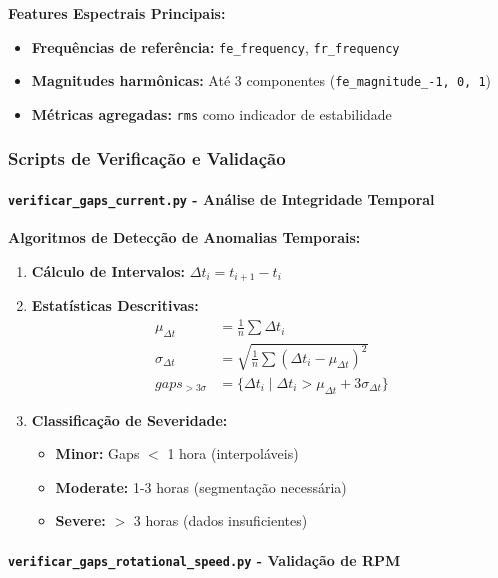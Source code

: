 \textbf{Features Espectrais Principais:}
\begin{itemize}
    \item \textbf{Frequências de referência:} \texttt{fe\_frequency}, \texttt{fr\_frequency}
    \item \textbf{Magnitudes harmônicas:} Até 3 componentes (\texttt{fe\_magnitude\_-1, 0, 1})
    \item \textbf{Métricas agregadas:} \texttt{rms} como indicador de estabilidade
\end{itemize}

\subsubsection{Scripts de Verificação e Validação}

\paragraph{\texttt{verificar\_gaps\_current.py} - Análise de Integridade Temporal}

\textbf{Algoritmos de Detecção de Anomalias Temporais:}

\begin{enumerate}
    \item \textbf{Cálculo de Intervalos:} $\Delta t_i = t_{i+1} - t_i$
    \item \textbf{Estatísticas Descritivas:}
    \begin{align}
    \mu_{\Delta t} &= \frac{1}{n} \sum \Delta t_i \\
    \sigma_{\Delta t} &= \sqrt{\frac{1}{n} \sum (\Delta t_i - \mu_{\Delta t})^2} \\
    gaps_{>3\sigma} &= \{ \Delta t_i \mid \Delta t_i > \mu_{\Delta t} + 3\sigma_{\Delta t} \}
    \end{align}
    \item \textbf{Classificação de Severidade:}
    \begin{itemize}
        \item \textbf{Minor:} Gaps $<$ 1 hora (interpoláveis)
        \item \textbf{Moderate:} 1-3 horas (segmentação necessária)
        \item \textbf{Severe:} $>$ 3 horas (dados insuficientes)
    \end{itemize}
\end{enumerate}

\paragraph{\texttt{verificar\_gaps\_rotational\_speed.py} - Validação de RPM}


